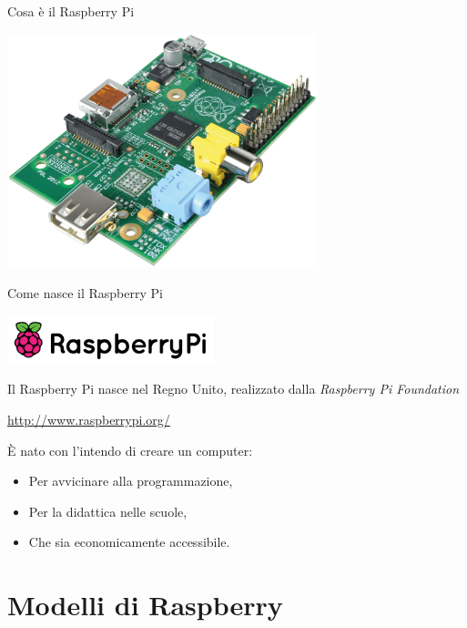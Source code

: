 \documentclass[xcolor=svgnames,11pt]{beamer}
\begin{document}
\begin{frame}{Cosa \`e il Raspberry Pi}
\begin{center}
\includegraphics[width=9cm]{raspi.png}
\end{center}
\end{frame}


\begin{frame}{Come nasce il Raspberry Pi}
\begin{center}
\includegraphics[width=6cm]{logo_raspi.png}
\end{center}
\pause

Il Raspberry Pi nasce nel Regno Unito, realizzato dalla \emph{Raspberry Pi Foundation}

\begin{center}
\url{http://www.raspberrypi.org/}
\end{center}

\pause
\medskip

\begin{block}{}
\`E nato con l'intendo di creare un computer:
\pause
\begin{itemize}
\item Per avvicinare alla programmazione,
\pause
\item Per la didattica nelle scuole,
\pause
\item Che sia economicamente accessibile.
\end{itemize}
\end{block}
\end{frame}

\section{Modelli di Raspberry}
\end{document}
